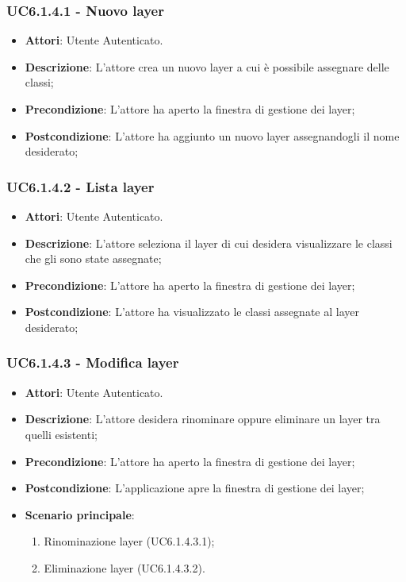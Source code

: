 \subsubsection{UC6.1.4.1 - Nuovo layer} 
\label{sssec:UC6.1.4.1} 
\begin{itemize} 
\item \textbf{Attori}: Utente Autenticato.
\item \textbf{Descrizione}: L'attore crea un nuovo layer a cui è possibile assegnare delle classi;
\item \textbf{Precondizione}: L'attore ha aperto la finestra di gestione dei layer;
\item \textbf{Postcondizione}: L'attore ha aggiunto un nuovo layer assegnandogli il nome desiderato;
\end{itemize} 
\subsubsection{UC6.1.4.2 - Lista layer} 
\label{sssec:UC6.1.4.2} 
\begin{itemize} 
\item \textbf{Attori}: Utente Autenticato.
\item \textbf{Descrizione}: L'attore seleziona il layer di cui desidera visualizzare le classi che gli sono state assegnate;
\item \textbf{Precondizione}: L'attore ha aperto la finestra di gestione dei layer;
\item \textbf{Postcondizione}: L'attore ha visualizzato le classi assegnate al layer desiderato;
\end{itemize} 
\subsubsection{UC6.1.4.3 - Modifica layer} 
\label{sssec:UC6.1.4.3} 
\begin{itemize} 
\item \textbf{Attori}: Utente Autenticato.
\item \textbf{Descrizione}: L'attore desidera rinominare oppure eliminare un layer tra quelli esistenti;
\item \textbf{Precondizione}: L'attore ha aperto la finestra di gestione dei layer;
\item \textbf{Postcondizione}: L'applicazione apre la finestra di gestione dei layer;
\item \textbf{Scenario principale}: \begin{enumerate}\item Rinominazione layer (UC6.1.4.3.1);\item Eliminazione layer (UC6.1.4.3.2). 
 \end{enumerate}
\end{itemize} 
